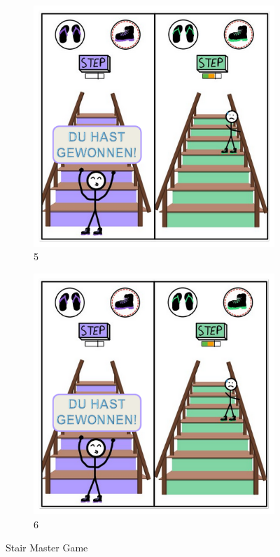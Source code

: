 \documentclass{article}
\begin{document}
\begin{figure}[H]
    \vspace{0.5cm}

    \begin{subfigure}[t]{0.45\textwidth}
        \centering
        \includegraphics[width=\textwidth]{./resources/StairMaster_5.png}
        \caption{5}
    \end{subfigure}
    \hfill
    \begin{subfigure}[t]{0.45\textwidth}
        \centering
        \includegraphics[width=\textwidth]{./resources/StairMaster_6.png}
        \caption{6}
    \end{subfigure}

    \caption{Stair Master Game}
    \label{fig:StairMaster}
\end{figure}
\end{document}
